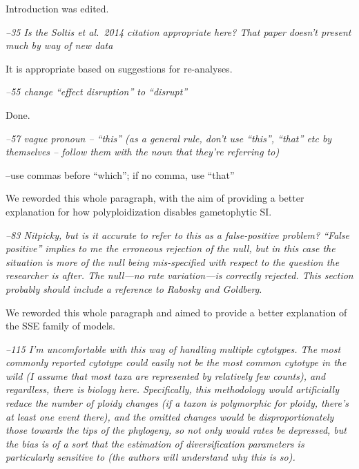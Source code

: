\documentclass[11pt]{article}
\renewenvironment{quote}{\bigskip\noindent\itshape\ignorespaces}{\smallskip}
\begin{document}
Introduction was edited.


\begin{quote}
--35 Is the Soltis et al.\ 2014 citation appropriate here?
That paper doesn't present much by way of new data
\end{quote}

It is appropriate based on suggestions for re-analyses.


\begin{quote}
--55 change ``effect disruption'' to ``disrupt''
\end{quote}

Done.


\begin{quote}
--57 vague pronoun -- ``this'' (as a general rule, don't use ``this'', ``that'' etc by themselves -- follow them with the noun that they're referring to)

--use commas before ``which''; if no comma, use ``that''
\end{quote}

We reworded this whole paragraph, with the aim of providing a better explanation for how polyploidization disables gametophytic SI.


\begin{quote}
--83 Nitpicky, but is it accurate to refer to this as a false-positive problem?
``False positive'' implies to me the erroneous rejection of the null, but in this case the situation is more of the null being mis-specified with respect to the question the researcher is after.
The null---no rate variation---is correctly rejected.
This section probably should include a reference to Rabosky and Goldberg.
\end{quote}

We reworded this whole paragraph and aimed to provide a better explanation of the SSE family of models.


\begin{quote}
--115 I'm uncomfortable with this way of handling multiple cytotypes.
The most commonly reported cytotype could easily not be the most common cytotype in the wild (I assume that most taxa are represented by relatively few counts), and regardless, there is biology here.
Specifically, this methodology would artificially reduce the number of ploidy changes (if a taxon is polymorphic for ploidy, there's at least one event there), and the omitted changes would be disproportionately those towards the tips of the phylogeny, so not only would rates be depressed, but the bias is of a sort that the estimation of diversification parameters is particularly sensitive to (the authors will understand why this is so).
\end{quote}
\end{document}
